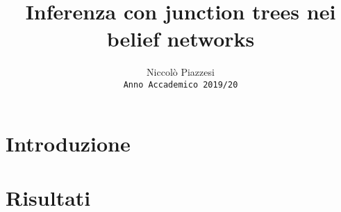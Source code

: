 \documentclass{article}
\begin{document}
\title{ \textbf{Inferenza con junction trees nei belief networks}}
\author{Niccolò Piazzesi\\ \texttt{Anno Accademico 2019/20}}
\date{}
\maketitle
\tableofcontents
\newpage
\section{Introduzione}
\section{Risultati}
\end{document}
